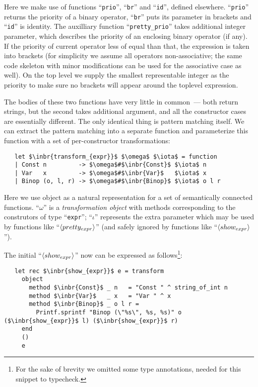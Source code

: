 Here we make use of functions ``\lstinline{prio}'', ``\lstinline{br}'' and ``\lstinline{id}'', defined elsewhere. ``\lstinline{prio}''
returns the priority of a binary operator, ``\lstinline{br}'' puts its parameter in brackets and ``\lstinline{id}''
is identity. The auxilliary function ``\lstinline{pretty_prio}'' takes additional integer parameter, which describes the priority of an enclosing
binary operator (if any). If the priority of current operator less of equal than that, the expression is taken into brackets (for simplicity we assume all
operators non-associative; the same code skeleton with minor modifications can be used for the associative case as well). On the top level we supply the
smallest representable integer as the priority to make sure no brackets will appear around the toplevel expression.

The bodies of these two functions have very little in common~--- both return strings, but the second takes additional argument, and all the constructor cases
are essentially different. The only identical thing is pattern matching itself. We can extract the pattern matching into a separate function and parameterize this
function with a set of per-constructor transformations:

\begin{lstlisting}
   let $\inbr{transform_{expr}}$ $\omega$ $\iota$ = function
   | Const n         -> $\omega$#$\inbr{Const}$ $\iota$ n
   | Var   x         -> $\omega$#$\inbr{Var}$   $\iota$ x
   | Binop (o, l, r) -> $\omega$#$\inbr{Binop}$ $\iota$ o l r
\end{lstlisting}

Here we use object as a natural representation for a set of semantically connected functions. ``$\omega$'' is a \emph{transformation object} with methods corresponding to
the construtors of type ``\lstinline{expr}''; ``$\iota$'' represents the extra parameter which may be used by functions like ``$\left<pretty_{expr}\right>$'' (and safely
ignored by functions like ``$\left<show_{expr}\right>$'').

The initial ``$\left<show_{expr}\right>$'' now can be expressed as follows\footnote{For the sake of brevity we omitted some type annotations, needed for this snippet to typecheck.}:

\begin{lstlisting}
   let rec $\inbr{show_{expr}}$ e = transform
     object
       method $\inbr{Const}$ _ n   = "Const " ^ string_of_int n
       method $\inbr{Var}$   _ x   = "Var " ^ x
       method $\inbr{Binop}$ _ o l r =
         Printf.sprintf "Binop (\"%s\", %s, %s)" o ($\inbr{show_{expr}}$ l) ($\inbr{show_{expr}}$ r)
     end
     ()
     e
\end{lstlisting}

